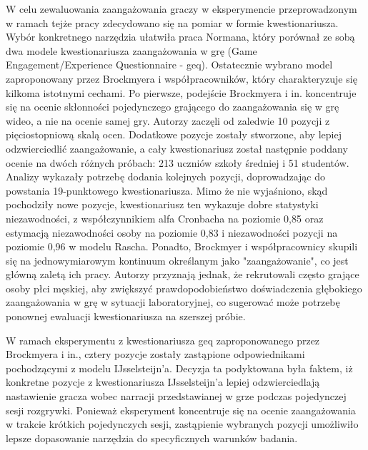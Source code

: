 W celu zewaluowania zaangażowania graczy w eksperymencie przeprowadzonym w ramach tejże pracy
zdecydowano się na pomiar w formie kwestionariusza.
Wybór konkretnego narzędzia ułatwiła praca Normana\cite{geq}, który porównał ze sobą dwa modele kwestionariusza
zaangażowania w grę (Game Engagement/Experience Questionnaire - \gls{geq})\cite{development_of_game}\cite{game_exp_quest}. Ostatecznie wybrano model
zaproponowany przez Brockmyera i współpracowników\cite{development_of_game}, który charakteryzuje się kilkoma istotnymi cechami.
Po pierwsze, podejście Brockmyera i in.\cite{development_of_game} koncentruje się na ocenie skłonności pojedynczego grającego do
zaangażowania się w grę wideo, a nie na ocenie samej gry\cite{geq}. Autorzy\cite{development_of_game} zaczęli od
zaledwie 10 pozycji z pięciostopniową skalą ocen. Dodatkowe pozycje zostały stworzone, aby lepiej
odzwierciedlić zaangażowanie, a cały kwestionariusz został następnie poddany ocenie na dwóch różnych próbach: 213 uczniów szkoły
średniej i 51 studentów. Analizy wykazały potrzebę dodania kolejnych pozycji, doprowadzając do powstania
19-punktowego kwestionariusza. Mimo że nie wyjaśniono, skąd pochodziły nowe pozycje, kwestionariusz ten
wykazuje dobre statystyki niezawodności\cite{geq}, z współczynnikiem alfa Cronbacha na poziomie 0,85 oraz estymacją
niezawodności osoby na poziomie 0,83 i niezawodności pozycji na poziomie 0,96 w modelu Rascha\cite{development_of_game}.
Ponadto, Brockmyer i współpracownicy\cite{development_of_game}
skupili się na jednowymiarowym kontinuum określanym jako "zaangażowanie", co jest główną zaletą ich
pracy\cite{geq}. Autorzy przyznają jednak, że rekrutowali często grające osoby płci męskiej,
aby zwiększyć prawdopodobieństwo doświadczenia głębokiego zaangażowania w grę w sytuacji
laboratoryjnej, co sugerować może potrzebę ponownej ewaluacji kwestionariusza na szerszej próbie\cite{geq}.

W ramach eksperymentu z kwestionariusza \gls{geq} zaproponowanego przez Brockmyera i in.\cite{development_of_game}, cztery
pozycje zostały zastąpione odpowiednikami pochodzącymi z modelu IJsselsteijn'a\cite{game_exp_quest}. Decyzja ta podyktowana
była faktem, iż konkretne pozycje z kwestionariusza IJsselsteijn'a\cite{game_exp_quest} lepiej odzwierciedlają nastawienie gracza wobec
narracji przedstawianej w grze podczas pojedynczej sesji rozgrywki. Ponieważ eksperyment koncentruje się na ocenie
zaangażowania w trakcie krótkich pojedynczych sesji, zastąpienie wybranych pozycji umożliwiło lepsze
dopasowanie narzędzia do specyficznych warunków badania.

